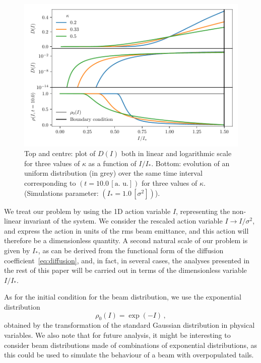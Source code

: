 \begin{figure}[htp]
    \centering
    \includegraphics[width=\textwidth]{4_probing_the_diffusive_behavior/figs/diffusion_coefficient.pdf}
    \caption{Top and centre: plot of $D(I)$ both in linear and logarithmic scale for three values of $\kappa$ as a function of $I/I_\ast$.
    Bottom: evolution of an uniform distribution (in grey) over the same time interval corresponding to $(t=10.0 \, [\text{a. u.}])$ for three values of $\kappa$. (Simulations parameter: $(I_\ast = 1.0\,[\sigma^2])$).}
    \label{fig:1}
\end{figure}

We treat our problem by using the 1D action variable $I$, representing the non-linear invariant of the system. We consider the rescaled action variable $I \to I/\sigma^2$, and express the action in units of {the rms} beam emittance, and this action will therefore be a dimensionless quantity. {A second natural scale of our problem is given by $I_\ast$, as can be derived from the functional form of the diffusion coefficient~\eqref{eq:diffusion}, and, in fact, in several cases, the analyses presented in the rest of this paper will be carried out in terms of the dimensionless variable $I/I_\ast$.}

As for the initial condition for the beam distribution, we use the exponential distribution
\begin{equation}
    \rho_0(I) = \exp(-I) \, , 
    \label{eq:initial_distribution}
\end{equation}
obtained by the transformation of the standard Gaussian distribution in physical variables. We also note that for future analysis, it might be interesting to consider beam distributions made of combinations of exponential distributions, as this could be used to simulate the behaviour of a beam with overpopulated tails.

